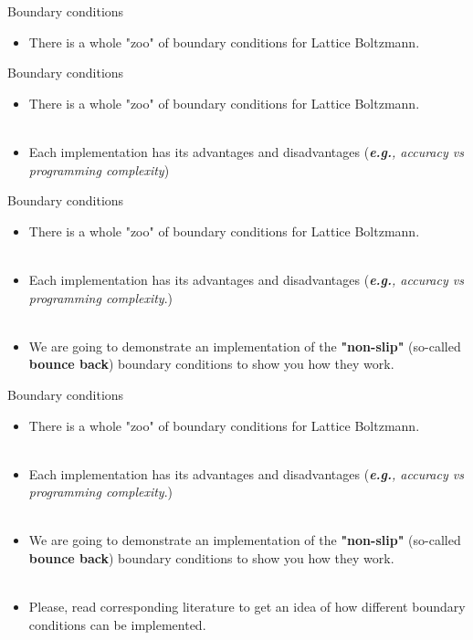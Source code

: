 \documentclass[9pt]{beamer}
\begin{document}
\begin{frame}[t]{Boundary conditions}
\begin{itemize}
\item There is a whole "zoo" of boundary conditions for Lattice Boltzmann.
\end{itemize}
\end{frame}
 
\begin{frame}[t]{Boundary conditions}
\begin{itemize}
\item There is a whole "zoo" of boundary conditions for Lattice Boltzmann.
\\~\\
\item Each implementation has its advantages and disadvantages (\textit{\textbf{e.g.}, accuracy vs programming complexity})
\end{itemize}
\end{frame}

\begin{frame}[t]{Boundary conditions}
\begin{itemize}
\item There is a whole "zoo" of boundary conditions for Lattice Boltzmann.
\\~\\
\item Each implementation has its advantages and disadvantages (\textit{\textbf{e.g.}, accuracy vs programming complexity}.)
\\~\\
\item We are going to demonstrate an implementation of the \textbf{"non-slip"} (so-called \textbf{bounce back}) boundary conditions to show you how they work.
\end{itemize}
\end{frame}

\begin{frame}[t]{Boundary conditions}
\begin{itemize}
\item There is a whole "zoo" of boundary conditions for Lattice Boltzmann.
\\~\\
\item Each implementation has its advantages and disadvantages (\textit{\textbf{e.g.}, accuracy vs programming complexity}.)
\\~\\
\item We are going to demonstrate an implementation of the \textbf{"non-slip"} (so-called \textbf{bounce back}) boundary conditions to show you how they work.
\\~\\
\item Please, read corresponding literature to get an idea of how different boundary conditions can be implemented.
\end{itemize}
\end{frame}
\end{document}
